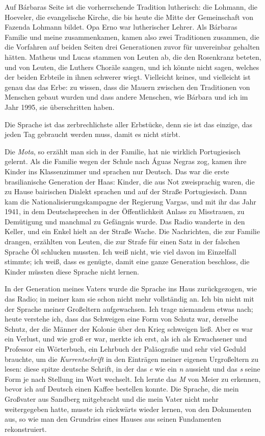 \documentclass[
  ngerman,
  11pt,
  openany]{book}
\begin{document}
Auf Bárbaras Seite ist die vorherrschende Tradition lutherisch: die
Lohmann, die Hoeveler, die evangelische Kirche, die bis heute die Mitte
der Gemeinschaft von Fazenda Lohmann bildet. Opa Erno war lutherischer
Lehrer. Als Bárbaras Familie und meine zusammenkamen, kamen also zwei
Traditionen zusammen, die die Vorfahren auf beiden Seiten drei
Generationen zuvor für unvereinbar gehalten hätten. Matheus und Lucas
stammen von Leuten ab, die den Rosenkranz beteten, und von Leuten, die
Luthers Choräle sangen, und ich könnte nicht sagen, welches der beiden
Erbteile in ihnen schwerer wiegt. Vielleicht keines, und vielleicht ist
genau das das Erbe: zu wissen, dass die Mauern zwischen den Traditionen
von Menschen gebaut wurden und dass andere Menschen, wie Bárbara und ich
im Jahr 1995, sie überschritten haben.

Die Sprache ist das zerbrechlichste aller Erbstücke, denn sie ist das
einzige, das jeden Tag gebraucht werden muss, damit es nicht stirbt.

Die \emph{Mota}, so erzählt man sich in der Familie, hat nie wirklich
Portugiesisch gelernt. Als die Familie wegen der Schule nach Águas
Negras zog, kamen ihre Kinder ins Klassenzimmer und sprachen nur
Deutsch. Das war die erste brasilianische Generation der Haas: Kinder,
die aus Not zweisprachig waren, die zu Hause bairischen Dialekt sprachen
und auf der Straße Portugiesisch. Dann kam die Nationalisierungskampagne
der Regierung Vargas, und mit ihr das Jahr 1941, in dem Deutschsprechen
in der Öffentlichkeit Anlass zu Misstrauen, zu Demütigung und manchmal
zu Gefängnis wurde. Das Radio wanderte in den Keller, und ein Enkel
hielt an der Straße Wache. Die Nachrichten, die zur Familie drangen,
erzählten von Leuten, die zur Strafe für einen Satz in der falschen
Sprache Öl schlucken mussten. Ich weiß nicht, wie viel davon im
Einzelfall stimmte; ich weiß, dass es genügte, damit eine ganze
Generation beschloss, die Kinder müssten diese Sprache nicht lernen.

In der Generation meines Vaters wurde die Sprache ins Haus
zurückgezogen, wie das Radio; in meiner kam sie schon nicht mehr
vollständig an. Ich bin nicht mit der Sprache meiner Großeltern
aufgewachsen. Ich trage niemandem etwas nach; heute verstehe ich, dass
das Schweigen eine Form von Schutz war, derselbe Schutz, der die Männer
der Kolonie über den Krieg schweigen ließ. Aber es war ein Verlust, und
wie groß er war, merkte ich erst, als ich als Erwachsener und Professor
ein Wörterbuch, ein Lehrbuch der Paläografie und sehr viel Geduld
brauchte, um die \emph{Kurrentschrift} in den Einträgen meiner eigenen
Urgroßeltern zu lesen: diese spitze deutsche Schrift, in der das
\emph{e} wie ein \emph{n} aussieht und das \emph{s} seine Form je nach
Stellung im Wort wechselt. Ich lernte das \emph{M} von Meier zu
erkennen, bevor ich auf Deutsch einen Kaffee bestellen konnte. Die
Sprache, die mein Großvater aus Sandberg mitgebracht und die mein Vater
nicht mehr weitergegeben hatte, musste ich rückwärts wieder lernen, von
den Dokumenten aus, so wie man den Grundriss eines Hauses aus seinen
Fundamenten rekonstruiert.
\end{document}
